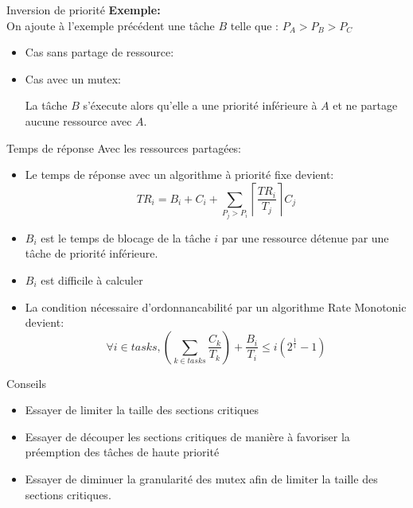 \begin{frame}{Inversion de priorité}
  \textbf{Exemple:}\\
  On ajoute à l'exemple précédent une  tâche $B$ telle que :
  $P_A > P_B > P_C$
  \begin{itemize}
  \item   Cas sans partage de ressource:
    \begin{center}
      
    \end{center}
  \item   Cas avec un mutex:
    \begin{center}
      
    \end{center}
    La tâche $B$  s'éxecute alors qu'elle a une  priorité inférieure à
    $A$ et ne partage aucune ressource avec $A$.
  \end{itemize}
\end{frame}

\begin{frame}{Temps de réponse}
  Avec  les  ressources  partagées:
  \begin{itemize}
  \item  Le  temps de  réponse  avec  un  algorithme à  priorité  fixe
    devient:
    $$TR_i = B_i + C_i + \sum_{P_j > P_i} \left\lceil\frac{TR_i}{T_j}\right\rceil C_j$$
  \item  $B_i$  est le  temps  de  blocage de  la  tâche  $i$ par  une
    ressource
    détenue par une tâche de priorité inférieure.
  \item $B_i$ est difficile à calculer
  \item La  condition nécessaire d'ordonnancabilité  par un algorithme
    Rate Monotonic devient:
    $$\forall i \in tasks, \left( \sum_{k \in tasks} \frac{C_k}{T_k} \right) + \frac{B_i}{T_i} ≤ i \left(2^{\frac{1}{i}}-1\right)$$
  \end{itemize}
\end{frame}

\begin{frame}{Conseils}
  \begin{itemize}
  \item Essayer de limiter la taille des sections critiques
  \item  Essayer  de découper  les  sections  critiques  de manière  à
    favoriser la préemption des tâches de haute priorité
  \item Essayer de  diminuer la granularité des mutex  afin de limiter
    la taille des sections critiques.
  \end{itemize}
\end{frame}

